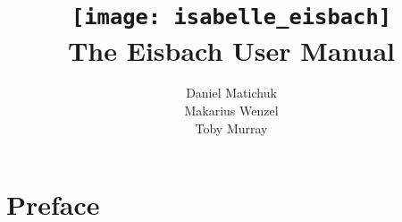 \documentclass[12pt,a4paper,fleqn]{report}
\title{\texttt{[image: isabelle\_eisbach]}
  \\[4ex] The Eisbach User Manual}
\author{Daniel Matichuk \\
  Makarius Wenzel \\
  Toby Murray
}
\begin{document}
\maketitle

\chapter*{Preface}

\tableofcontents
\clearfirst



\begingroup
\tocentry{\bibname}
 \small\raggedright\frenchspacing

\endgroup

\tocentry{\indexname}
\printindex
\end{document}
